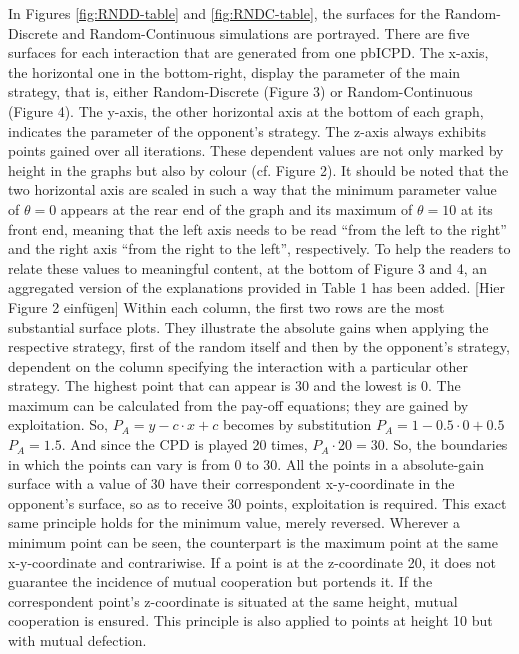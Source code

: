 \documentclass[11pt]{article}
\begin{document}
In Figures \ref{fig:RNDD-table} and \ref{fig:RNDC-table}, the surfaces for the Random-Discrete and Random-Continuous simulations are portrayed. 
There are five surfaces for each interaction that are generated from one pbICPD. 
The x-axis, the horizontal one in the bottom-right, display the parameter of the main strategy, that is, either Random-Discrete (Figure 3) or Random-Continuous (Figure 4). 
The y-axis, the other horizontal axis at the bottom of each graph, indicates the parameter of the opponent’s strategy. 
The z-axis always exhibits points gained over all iterations. 
These dependent values are not only marked by height in the graphs but also by colour (cf. Figure 2). 
It should be noted that the two horizontal axis are scaled in such a way that the minimum parameter value of $\theta = 0$ appears at the rear end of the graph and its maximum of $\theta = 10$ at its front end, meaning that the left axis needs to be read “from the left to the right” and the right axis “from the right to the left”, respectively. 
To help the readers to relate these values to meaningful content, at the bottom of Figure 3 and 4, an aggregated version of the explanations provided in Table 1 has been added.
[Hier Figure 2 einfügen]
Within each column, the first two rows are the most substantial surface plots. 
They illustrate the absolute gains when applying the respective strategy, first of the random itself and then by the opponent’s strategy, dependent on the column specifying the interaction with a particular other strategy.
The highest point that can appear is 30 and the lowest is 0. 
The maximum can be calculated from the pay-off equations; they are gained by exploitation. 
So, $P_A = y - c \cdot x + c$ becomes by substitution $P_A = 1 - 0.5 \cdot 0 + 0.5$ \textrightarrow $P_A = 1.5$.
And since the CPD is played 20 times, $P_A \cdot 20 = 30$.
So, the boundaries in which the points can vary is from 0 to 30. 
All the points in a absolute-gain surface with a value of 30 have their correspondent x-y-coordinate in the opponent’s surface, so as to receive 30 points, exploitation is required. 
This exact same principle holds for the minimum value, merely reversed.
Wherever a minimum point can be seen, the counterpart is the maximum point at the same x-y-coordinate and contrariwise.
If a point is at the z-coordinate 20, it does not guarantee the incidence of mutual cooperation but portends it.
If the correspondent point's z-coordinate is situated at the same height, mutual cooperation is ensured.
This principle is also applied to points at height 10 but with mutual defection.\\
\end{document}
